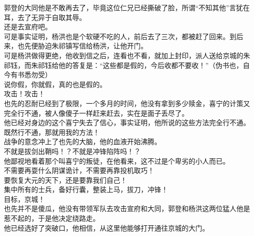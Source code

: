 \begin{multicols}{\theparacolNo}
郭登的大同他是不敢再去了，毕竟这位仁兄已经撕破了脸，所谓“不知其他”言犹在耳，去了无异于自取其辱。\\

还是去宣府吧。\\

可是事实证明，杨洪也是个软硬不吃的人，前后去了三次，都被赶了回来。到后来，也先便胁迫朱祁镇写信给杨洪，让他开门。\\

可是杨洪做得更绝，他收到信之后，连看也不看，就加上封印，派人送给京城的朱祁钰，而朱祁钰给他的答复是：“这些都是假的，今后收都不要收！”（伪书也，自今有书悉勿受）\\

说你假，你就假，真的也是假的。\\

攻击！攻击！\\

也先的忍耐已经到了极限，一个多月的时间，他没有拿到多少赎金，喜宁的计策又完全行不通，被人像傻子一样赶来赶去，实在是面子丢尽了。\\

他已经对身边的这个喜宁失去了信心，事实证明，他所说的这些方法完全行不通。\\

既然行不通，那就用我的方法！\\

战争的意念冲上了也先的大脑，他的血液开始沸腾。\\

不就是拔剑出鞘吗！？不就是冲锋陷阵吗！？\\

他鄙视地看着那个叫喜宁的叛徒，在他看来，这不过是个卑劣的小人而已。\\

不需要再耍什么阴谋诡计，不需要再靠投机取巧！\\

要恢复大元的天下，还是要靠我们自己！\\

集中所有的士兵，备好行囊，整装上马，拔刀，冲锋！\\

目标，京城！\\

也先并不是傻瓜，他没有带领军队去攻击宣府和大同，郭登和杨洪这两位猛人他是惹不起的，于是他决定绕路走。\\

他已经选好了突破口，他相信，从这里他能够打开通往京城的大门。\\


\end{multicols}

